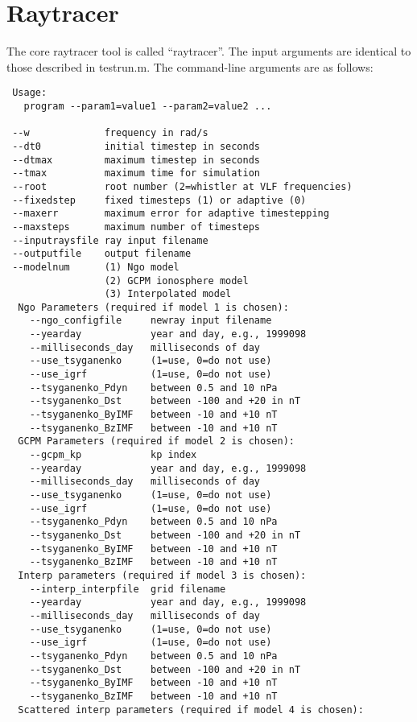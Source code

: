 \documentclass[10pt]{article}
\begin{document}
\section{Raytracer}

The core raytracer tool is called ``raytracer''.  The input arguments
are identical to those described in testrun.m.  The command-line
arguments are as follows:

\begin{verbatim}
 Usage:
   program --param1=value1 --param2=value2 ...
   
 --w             frequency in rad/s
 --dt0           initial timestep in seconds
 --dtmax         maximum timestep in seconds
 --tmax          maximum time for simulation
 --root          root number (2=whistler at VLF frequencies)
 --fixedstep     fixed timesteps (1) or adaptive (0)
 --maxerr        maximum error for adaptive timestepping
 --maxsteps      maximum number of timesteps
 --inputraysfile ray input filename
 --outputfile    output filename
 --modelnum      (1) Ngo model
                 (2) GCPM ionosphere model
                 (3) Interpolated model
  Ngo Parameters (required if model 1 is chosen):
    --ngo_configfile     newray input filename
    --yearday            year and day, e.g., 1999098
    --milliseconds_day   milliseconds of day
    --use_tsyganenko     (1=use, 0=do not use)
    --use_igrf           (1=use, 0=do not use)
    --tsyganenko_Pdyn    between 0.5 and 10 nPa
    --tsyganenko_Dst     between -100 and +20 in nT
    --tsyganenko_ByIMF   between -10 and +10 nT
    --tsyganenko_BzIMF   between -10 and +10 nT
  GCPM Parameters (required if model 2 is chosen):
    --gcpm_kp            kp index
    --yearday            year and day, e.g., 1999098
    --milliseconds_day   milliseconds of day
    --use_tsyganenko     (1=use, 0=do not use)
    --use_igrf           (1=use, 0=do not use)
    --tsyganenko_Pdyn    between 0.5 and 10 nPa
    --tsyganenko_Dst     between -100 and +20 in nT
    --tsyganenko_ByIMF   between -10 and +10 nT
    --tsyganenko_BzIMF   between -10 and +10 nT
  Interp parameters (required if model 3 is chosen):
    --interp_interpfile  grid filename
    --yearday            year and day, e.g., 1999098
    --milliseconds_day   milliseconds of day
    --use_tsyganenko     (1=use, 0=do not use)
    --use_igrf           (1=use, 0=do not use)
    --tsyganenko_Pdyn    between 0.5 and 10 nPa
    --tsyganenko_Dst     between -100 and +20 in nT
    --tsyganenko_ByIMF   between -10 and +10 nT
    --tsyganenko_BzIMF   between -10 and +10 nT
  Scattered interp parameters (required if model 4 is chosen):

\end{verbatim}
\end{document}
